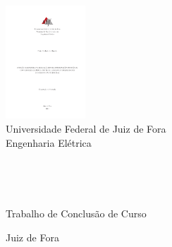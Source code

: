 \thispagestyle{empty}
\begin{center}

\includegraphics[width=3.0cm]{./logos/ufjf_logo}\\
\medskip
Universidade Federal de  Juiz de Fora\\
Engenharia Elétrica

\vfill

\Autor\\

\vfill


\TITULO\\

\vfill

Trabalho de Conclusão de Curso\\

\vfill

Juiz de Fora\\
\Ano\\

\end{center}
\newpage
